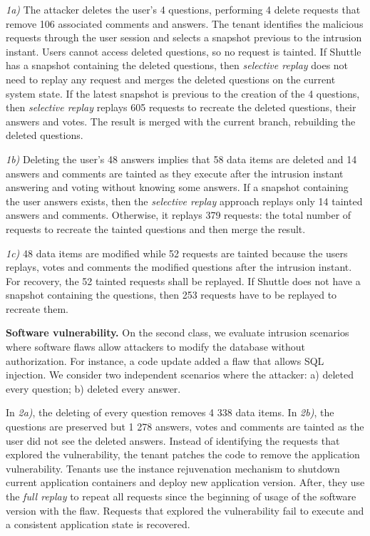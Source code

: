 \textit{1a)} The attacker deletes the user's 4 questions, performing 4 delete requests that remove 106 associated comments and answers. The tenant identifies the malicious requests through the user session and selects a snapshot previous to the intrusion instant. Users cannot access deleted questions, so no request is tainted. If Shuttle has a snapshot containing the deleted questions, then \textit{selective replay} does not need to replay any request and merges the deleted questions on the current system state. If the latest snapshot is previous to the creation of the 4 questions, then \textit{selective replay} replays 605 requests to recreate the deleted questions, their answers and votes. The result is merged with the current branch, rebuilding the deleted questions. 

\textit{1b)} Deleting the user's 48 answers implies that 58 data items are deleted and 14 answers and comments are tainted as they execute after the intrusion instant answering and voting without knowing some answers. If a snapshot containing the user answers exists, then the \textit{selective replay} approach replays only 14 tainted answers and comments. Otherwise, it replays 379 requests: the total number of requests to recreate the tainted questions and then merge the result.


\textit{1c)} 48 data items are modified while 52 requests are tainted because the users replays, votes and comments the modified questions after the intrusion instant. For recovery, the 52 tainted requests shall be replayed. If Shuttle does not have a snapshot containing the questions, then 253 requests have to be replayed to recreate them. 

\textbf{Software vulnerability.}
On the second class, we evaluate intrusion scenarios where software flaws allow attackers to modify the database without authorization. For instance, a code update added a flaw that allows SQL injection. We consider two independent scenarios where the attacker: a) deleted every question; b) deleted every answer.

In \textit{2a)}, the deleting of every question removes 4 338 data items. In \textit{2b)}, the questions are preserved but 1 278 answers, votes and comments are tainted as the user did not see the deleted answers.
%
Instead of identifying the requests that explored the vulnerability, the tenant patches the code to remove the application vulnerability. Tenants use the instance rejuvenation mechanism to shutdown current application containers and deploy new application version. After, they use the \textit{full replay} to repeat all requests since the beginning of usage of the software version with the flaw. Requests that explored the vulnerability fail to execute and a consistent application state is recovered.



